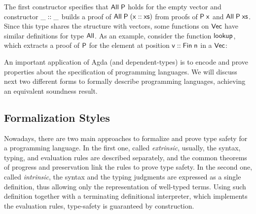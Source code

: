 \documentclass[tese,capa,english]{texufpel}
\makeatletter
\newcommand{\anonymous}{\kern0.06em \vbox{\hrule\@width.5em}}
\def\resethooks{%
  \global\let\SaveRestoreHook\empty
  \global\let\ColumnHook\empty}
\let\hspre\empty
\let\hspost\empty
\newcommand{\D}[1]{\blue{\mathsf{#1}}}
\newcommand{\Con}[1]{\green{\mathsf{#1}}}
\newcommand{\F}[1]{\blue{\mathsf{#1}}}
\newcommand{\V}[1]{\black{\mathsf{#1}}}
\makeatother
\begin{document}
The first constructor specifies that \ensuremath{\D{All}\;\V{P}} holds for the empty vector and constructor \ensuremath{\Con{\_::\_}} builds a proof of \ensuremath{\D{All}\;\V{P}\;(\V{x}\;\Con{::}\;\V{xs})} from proofs of \ensuremath{\V{P}\;\V{x}} and \ensuremath{\D{All}\;\V{P}\;\V{xs}}. Since this type shares the structure with vectors, some functions on \ensuremath{\D{Vec}} have similar definitions for type \ensuremath{\D{All}}. As an example, consider the function \ensuremath{\F{lookup}}, which extracts a proof of \ensuremath{\V{P}} for the element at position \ensuremath{\V{v}\;\Con{::}\;\D{Fin}\;\V{n}} in a \ensuremath{\D{Vec}}:

\resethooks

An important application of Agda (and dependent-types) is to encode and prove properties about the specification of programming languages. We will discuss next two different forms to formally describe programming languages, achieving an equivalent soundness result.

\subsection{Formalization Styles}

Nowadays, there are two main approaches to formalize and prove type safety for a programming language. In the first one, called \emph{extrinsic}, usually, the syntax, typing, and evaluation rules are described separately, and the common theorems of progress and preservation link the rules to prove type safety. In the second one, called \emph{intrinsic}, the syntax and the typing judgments are expressed as a single definition, thus allowing only the representation of well-typed terms. Using such definition together with a terminating definitional interpreter, which implements the evaluation rules, type-safety is guaranteed by construction.
\end{document}
